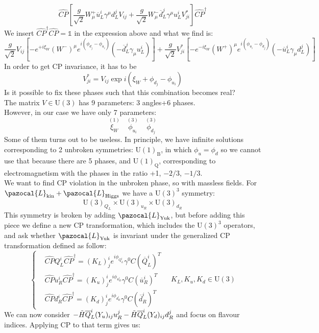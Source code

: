 \documentclass[../main.tex]{subfiles}
\begin{document}
\[
\hat{CP}\left[\frac{g}{\sqrt{2}}W_\mu^+\overline{u}_L^i\gamma^\mu d^j_LV_{ij}+\frac{g}{\sqrt{2}}W_\mu^-\overline{d}_L^j\gamma^\mu u_L^iV_{ji}^*\right]\hat{CP}^\dagger
\]
We insert $\hat{CP}^\dagger\hat{CP}=\mathbb{1}$ in the expression above and what we find is:
\[
\frac{g}{\sqrt{2}}V_{ij}\left[-e^{+i\xi_W}(W^-)^\mu e^{i(\phi_{d_j}-\phi_{u_i})}\left(-\overline{d}_L^j\gamma_\mu u_L^i\right)\right]+\frac{g}{\sqrt{2}}V_{ji}^*\left[-e^{-i\xi_W}(W^+)^\mu e^{i(\phi_{u_i}-\phi_{d_j})}\left(-\overline{u}_L^i\gamma_\mu d_L^j\right)\right]
\]
In order to get CP invariance, it has to be 
\[
V_{ji}^*=V_{ij}\exp{i(\xi_W+\phi_{d_j}-\phi_{u_i})}
\]
Is it possible to fix these phases such that this combination becomes real?\\
The matrix $V\in$U$(3)$ has 9 parameters: 3 angles+6 phases.\\
However, in our case we have only 7 parameters: 
\[
\overset{(1)}{\xi_W} \quad \overset{(3)}{\phi_{u_i}} \quad \overset{(3)}{\phi_{d_j}}
\]
Some of them turns out to be useless. In principle, we have infinite solutions corresponding to 2 unbroken symmetries: U$(1)_{\text{B}}$, in which $\phi_u=\phi_d$ so we cannot use that because there are 5 phases, and U$(1)_{\text{Q}}$, corresponding to electromagnetism with the phases in the ratio +1, $-2/3$, $-1/3$.\\
We want to find CP violation in the unbroken phase, so with massless fields. For $\pazocal{L}_{\text{kin}}+\pazocal{L}_{\text{Higgs}}$ we have a U$(3)^3$ symmetry: 
\[
\text{U}(3)_{Q_L}\times\text{U}(3)_{u_R}\times\text{U}(3)_{d_R}
\]
This symmetry is broken by adding $\pazocal{L}_{\text{Yuk}}$, but before adding this piece we define a new CP transformation, which includes the U$(3)^3$ operators, and ask whether $\pazocal{L}_{\text{Yuk}}$ is invariant under the generalized CP transformation defined as follow:
\[
\left\{
\begin{aligned}
&\hat{CP}Q_L^i\hat{CP}^\dagger=(K_L)^i_je^{i\phi_{Q_L^i}}\gamma^0C(\overline{Q}_L^i)^T\\
&\hat{CP}u_R^i\hat{CP}^\dagger=(K_u)^i_je^{i\phi_{u_R^i}}\gamma^0C(\overline{u}_R^i)^T\\
&\hat{CP}d_R^i\hat{CP}^\dagger=(K_d)^i_je^{i\phi_{d_R^i}}\gamma^0C(\overline{d}_R^i)^T
\end{aligned}
\right.
\quad 
K_L,K_u,K_d\in\text{U}(3)
\]
We can now consider $-\Tilde{H}\overline{Q}_L^i(Y_u)_{ij}u_R^j-\Tilde{H}\overline{Q}_L^i(Y_d)_{ij}d_R^j$ and focus on flavour indices. Applying CP to that term gives us:
\end{document}
